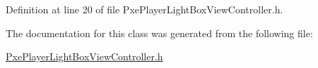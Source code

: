 Definition at line 20 of file Pxe\-Player\-Light\-Box\-View\-Controller.\-h.



The documentation for this class was generated from the following file\-:\begin{DoxyCompactItemize}
\item 
\hyperlink{_pxe_player_light_box_view_controller_8h}{Pxe\-Player\-Light\-Box\-View\-Controller.\-h}\end{DoxyCompactItemize}

